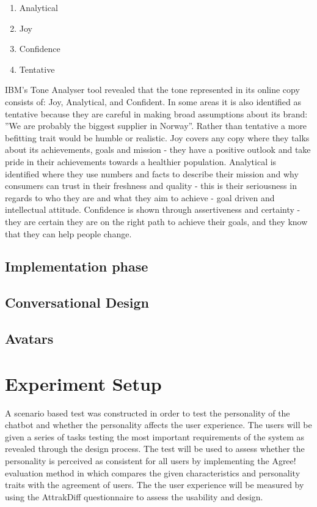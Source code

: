         \begin{enumerate}
            \item Analytical
            \item Joy
            \item Confidence
            \item Tentative
        \end{enumerate}

        IBM’s Tone Analyser tool revealed that the tone represented in its online copy consists of: Joy, Analytical, and Confident. In some areas it is also identified as tentative because they are careful in making broad assumptions about its brand: ”We are probably the biggest supplier in Norway”. Rather than tentative a more befitting trait would be humble or realistic. Joy covers any copy where they talks about its achievements, goals and mission - they have a positive outlook and take pride in their achievements towards a healthier population. Analytical is identified where they use numbers and facts to describe their mission and why consumers can trust in their freshness and quality - this is their seriousness in regards to who they are and what they aim to achieve - goal driven and intellectual attitude. Confidence is shown through assertiveness and certainty - they are certain they are on the right path to achieve their goals, and they know that they can help people change. 


    \subsection{Implementation phase}
        \subsection{Conversational Design}
        \subsection{Avatars}
    
    \vspace{5mm} %
    
    \section{Experiment Setup}
    
    A scenario based test was constructed in order to test the personality of the chatbot and whether the personality affects the user experience. The users will be given a series of tasks testing the most important requirements of the system as revealed through the design process. The test will be used to assess whether the personality is perceived as consistent for all users by implementing the Agree! evaluation method in which compares the given characteristics and personality traits with the agreement of users. The the user experience will be measured by using the AttrakDiff questionnaire to assess the usability and design. 
    
